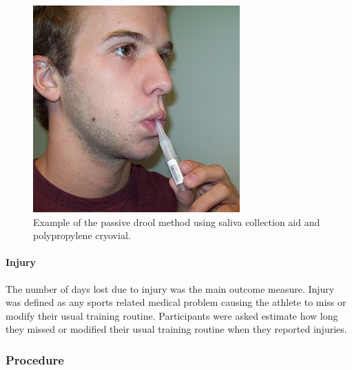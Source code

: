 \documentclass[man,floatsintext]{apa6}
\let\oldparagraph\paragraph
\renewcommand{\paragraph}[1]{\oldparagraph{#1}\mbox{}}
\begin{document}
\begin{figure}

{\centering \includegraphics[width=1\linewidth]{figs/measures/pd} 

}

\caption{Example of the passive drool method using saliva collection aid and polypropylene cryovial.}\label{fig:passivedrool}
\end{figure}

\hypertarget{injury-1}{%
\paragraph{Injury}\label{injury-1}}

The number of days lost due to injury was the main outcome measure.
Injury was defined as any sports related medical problem causing the athlete to miss or modify their usual training routine.
Participants were asked estimate how long they missed or modified their usual training routine when they reported injuries.

\hypertarget{procedure-1}{%
\subsubsection{Procedure}\label{procedure-1}}
\end{document}
